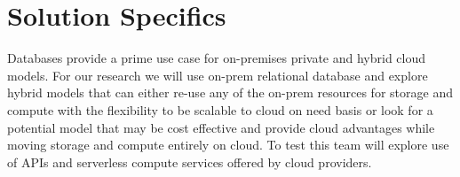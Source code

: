 \section*{Solution Specifics}
Databases provide a prime use case for on-premises private and hybrid cloud models. For our research we will use on-prem relational database and explore hybrid models that can either re-use any of the on-prem resources for storage and compute with the flexibility to be scalable to cloud on need basis or look for a potential model that may be cost effective and  provide cloud advantages while moving storage and compute entirely on cloud. To test this team will explore use of APIs and serverless compute services offered by cloud providers.